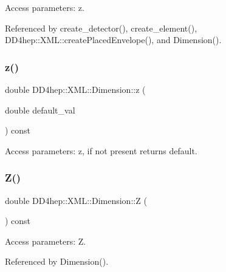 Access parameters\+: z. 



Referenced by create\+\_\+detector(), create\+\_\+element(), D\+D4hep\+::\+X\+M\+L\+::create\+Placed\+Envelope(), and Dimension().

\hypertarget{struct_d_d4hep_1_1_x_m_l_1_1_dimension_a73b44b93f09a731f0a5c77493b9253ae}{}\label{struct_d_d4hep_1_1_x_m_l_1_1_dimension_a73b44b93f09a731f0a5c77493b9253ae} 
\subsubsection{\texorpdfstring{z()}{z()}\hspace{0.1cm}{\footnotesize\ttfamily [2/2]}}
{\footnotesize\ttfamily double D\+D4hep\+::\+X\+M\+L\+::\+Dimension\+::z (\begin{DoxyParamCaption}\item[{double}]{default\+\_\+val }\end{DoxyParamCaption}) const}



Access parameters\+: z, if not present returns default. 

\hypertarget{struct_d_d4hep_1_1_x_m_l_1_1_dimension_ac407c9b56f9ac54ffbd172f8ccda2dab}{}\label{struct_d_d4hep_1_1_x_m_l_1_1_dimension_ac407c9b56f9ac54ffbd172f8ccda2dab} 
\subsubsection{\texorpdfstring{Z()}{Z()}\hspace{0.1cm}{\footnotesize\ttfamily [1/2]}}
{\footnotesize\ttfamily double D\+D4hep\+::\+X\+M\+L\+::\+Dimension\+::Z (\begin{DoxyParamCaption}{ }\end{DoxyParamCaption}) const}



Access parameters\+: Z. 



Referenced by Dimension().

\hypertarget{struct_d_d4hep_1_1_x_m_l_1_1_dimension_aedb058f136406aaabac74eb3652731d6}{}\label{struct_d_d4hep_1_1_x_m_l_1_1_dimension_aedb058f136406aaabac74eb3652731d6} 
